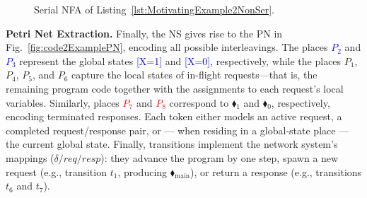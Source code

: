 \begin{figure}  %
	\centering


	\caption{Serial NFA of Listing~\ref{lst:MotivatingExample2NonSer}.}
	\label{fig:code2ExampleNFA}
\end{figure}




\medskip
\noindent
\textbf{Petri Net Extraction.}
%
Finally, the NS gives rise to the PN in Fig.~\ref{fig:code2ExamplePN}, encoding all possible interleavings. The places \textcolor{blue}{ $P_2$} and \textcolor{blue}{$P_3$} represent the global states \textcolor{blue}{[X=1]} and \textcolor{blue}{[X=0]}, respectively, while the places $P_1$, $P_4$, $P_5$, and $P_6$ capture the local states of in-flight requests—that is, the remaining program code together with the assignments to each request’s local variables. Similarly, places \textcolor{red}{$P_7$} and \textcolor{red}{$P_8$} correspond to {\color{red}$\blacklozenge_1$} and {\color{red}$\blacklozenge_0$}, respectively, encoding terminated responses. Each token either models an active request, a completed request/response pair, or --- when residing in a global-state place --- the current global state. Finally, transitions implement the network system’s mappings ($\delta/req/resp$): they advance the program by one step, spawn a new request (e.g., transition $t_1$, producing {\color{ForestGreen}$\blacklozenge_{\mathrm{main}}$}), or return a response (e.g., transitions $t_6$ and $t_7$).


